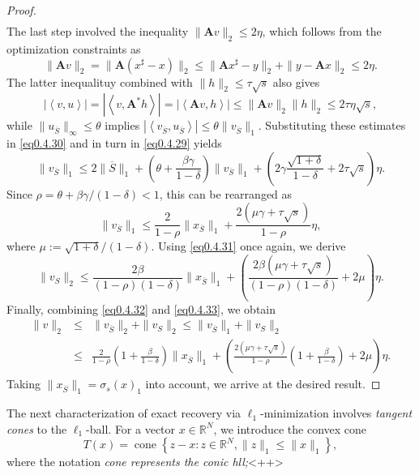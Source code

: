 \begin{proof}
\begin{eqnarray}
    \end{eqnarray}
    The last step involved the inequality $\|\mathbf{A}v\|_2 \leq 2\eta$, which follows from the optimization constraints as 
    \[
        \|\mathbf{A}v\|_2 = \|\mathbf{A}(x^{\sharp} -x)\|_2 \leq \|\mathbf{A}x^{\sharp} -y\|_2 + \|y-\mathbf{A}x\|_2 \leq 2\eta.
    \]
    The latter inequalituy combined with $\|h\|_2 \leq \tau\sqrt{s}$ also gives
    \[
        \left|\left<v,u\right>\right| = \left|\left<v, \mathbf{A}^*h\right>\right| = \left|\left<\mathbf{A}v, h\right>\right| \leq \|\mathbf{A}v\|_2 \|h\|_2 \leq 2\tau\eta\sqrt{s},
    \]
    while $\|u_{\overline{S}}\|_{\infty} \leq \theta$ implies $\left|\left<v_{\overline{S}}, u_{\overline{S}}\right>\right| \leq \theta \|v_{\overline{S}}\|_1$. Substituting these estimates in \cref{eq0.4.30} and in turn in \cref{eq0.4.29} yields
    \[
        \|v_{\overline{S}}\|_1 \leq 2\|\overline{S}\|_1 + \left( \theta+\frac{\beta\gamma}{1-\delta} \right)\|v_{\overline{S}}\|_1 + \left( 2\gamma\frac{\sqrt{1+\delta}}{1-\delta}+2\tau\sqrt{s} \right)\eta.
    \]
    Since $\rho = \theta + \beta\gamma/(1-\delta) < 1$, this can be rearranged as 
    \begin{equation}
        \|v_{\overline{S}}\|_1 \leq \frac{2}{1-\rho}\|x_{\overline{S}}\|_1 + \frac{2(\mu\gamma+\tau\sqrt{s})}{1-\rho}\eta,
        \label{eq0.4.32}
    \end{equation}
    where $\mu := \sqrt{1+\delta}/(1-\delta)$. Using \cref{eq0.4.31} once again, we derive
    \begin{equation}
        \|v_S\|_2 \leq \frac{2\beta}{(1-\rho)(1-\delta)} \|x_{\overline{S}}\|_1 + \left( \frac{2\beta(\mu\gamma+\tau\sqrt{s})}{(1-\rho)(1-\delta)}+2\mu \right)\eta.
        \label{eq0.4.33}
    \end{equation}
    Finally, combining \cref{eq0.4.32} and \cref{eq0.4.33}, we obtain
    \begin{eqnarray*}
        \|v\|_2 &\leq& \|v_{\overline{S}}\|_2 + \|v_S\|_2 \leq \|v_{\overline{S}}\|_1 + \|v_S\|_2 \\
        &\leq&\frac{2}{1-\rho}\left( 1+\frac{\beta}{1-\delta} \right) \|x_{\overline{S}}\|_1 + \left( \frac{2(\mu\gamma+\tau\sqrt{s})}{1-\rho} \left( 1+\frac{\beta}{1-\delta} \right) + 2\mu \right)\eta.
    \end{eqnarray*}
    Taking $\|x_{\overline{S}}\|_1 = \sigma_s(x)_1$ into account, we arrive at the desired result.
\end{proof}

The next characterization of exact recovery via $\ell_1$-minimization involves \emph{\textcolor[rgb]{1,0,0}{tangent cones}} to the $\ell_1$-ball. For a vector $x \in \mathbb{R}^N$, we introduce the convex cone
\begin{equation}
    T(x) = \mathop{\mathrm{cone}}\left\{ z-x : z\in \mathbb{R}^N, \|z\|_1 \leq \|x\|_1 \right\},
    \label{eq0.4.34}
\end{equation}
where the notation \emph{\textcolor[rgb]{1,0,0}{cone represents the conic hll;}}<++>

